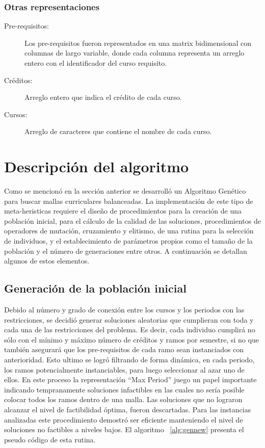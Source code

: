 \documentclass[letter, 10pt]{article}
\begin{document}
\subsubsection{Otras representaciones}
\begin{description}
\item[Pre-requisitos:] Los pre-requisitos fueron representados en una matrix
  bidimensional con columnas de largo variable, donde cada columna representa un
  arreglo entero con el identificador del curso requisito.
\item[Créditos:] Arreglo entero que indica el crédito de cada curso.
\item[Cursos:] Arreglo de caracteres que contiene el nombre de cada curso.

\end{description}


\section{Descripción del algoritmo}
Como se mencionó en la sección anterior se desarrolló un Algoritmo
Genético para buscar mallas curriculares balanceadas.  La
implementación de este tipo de meta-heristicas requiere el diseño de
procedimientos para la creación de una población inicial, para el
cálculo de la calidad de las soluciones, procedimientos de operadores
de mutación, cruzamiento y elitismo, de una rutina para la selección
de individuos, y el establecimiento de parámetros propios como el
tamaño de la población y el número de generaciones entre otros.  A
continuación se detallan algunos de estos elementos.

\subsection{Generación de la población inicial}
Debido al número y grado de conexión entre los cursos y los periodos con las
restricciones, se decidió generar soluciones aleatorias que cumplieran con toda
y cada una de las restricciones del problema. Es decir, cada individuo cumplirá
no sólo con el mínimo y máximo número de créditos y ramos por semestre, si no
que también asegurará que los pre-requisitos de cada ramo sean instanciados con
anterioridad. Esto ultimo se logró filtrando de forma dinámica, en cada periodo,
los ramos potencialmente instanciables, para luego seleccionar al azar uno de
ellos. En este proceso la representación ``Max Period'' juego un papel importante
indicando tempranamente soluciones infactibles en las cuales no sería posible
colocar todos los ramos dentro de una malla. Las soluciones que no lograron
alcanzar el nivel de factibilidad óptima, fueron descartadas. Para las
instancias analizadas este procedimiento demostró ser eficiente manteniendo el
nivel de soluciones no factibles a niveles bajos. El algoritmo ~\ref{alg:gennew}
presenta el pseudo código de esta rutina.
\end{document}
